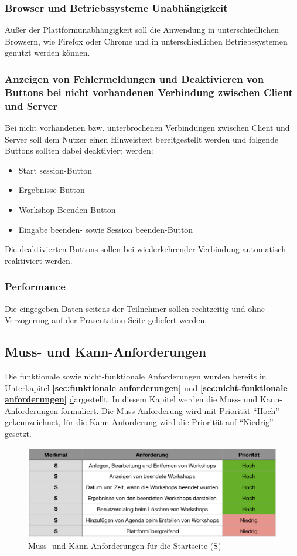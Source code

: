 \subsubsection*{Browser und Betriebssysteme Unabhängigkeit}
Außer der Plattformunabhängigkeit soll die Anwendung in unterschiedlichen Browsern, wie Firefox oder Chrome und in unterschiedlichen Betriebssystemen genutzt werden können.

\subsubsection*{Anzeigen von Fehlermeldungen und Deaktivieren von Buttons bei nicht vorhandenen Verbindung zwischen Client und Server}
Bei nicht vorhandenen bzw. unterbrochenen Verbindungen zwischen Client und Server soll dem Nutzer einen Hinweistext bereitgestellt werden und folgende Buttons sollten dabei deaktiviert werden:
\begin{itemize}
\item Start session-Button
\item Ergebnisse-Button
\item Workshop Beenden-Button
\item Eingabe beenden- sowie Session beenden-Button
\end{itemize}
Die deaktivierten Buttons sollen bei wiederkehrender Verbindung automatisch reaktiviert werden.

\subsubsection*{Performance}
Die eingegeben Daten seitens der Teilnehmer sollen rechtzeitig und ohne Verzögerung auf der Präsentation-Seite geliefert werden.

\subsection{Muss- und Kann-Anforderungen}
Die funktionale sowie nicht-funktionale Anforderungen wurden bereits in Unterkapitel \textbf{\ref{sec:funktionale anforderungen}} \hyperref[sec:funktionale anforderungen] und \textbf{\ref{sec:nicht-funktionale anforderungen}} \hyperref[sec:nicht-funktionale anforderungen] dargestellt. In diesem Kapitel werden die Muss- und Kann-Anforderungen formuliert. Die Muss-Anforderung wird mit Priorität “Hoch” gekennzeichnet, für die Kann-Anforderung wird die Priorität auf “Niedrig” gesetzt.\\

\begin{figure}[H]
  \centering  
  \includegraphics[scale=0.6]{img/Startseite.png}
  \caption{Muss- und Kann-Anforderungen für die Startseite (S)}
  \label{fig:startseite}
\end{figure}	


